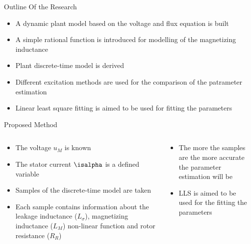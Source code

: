 \documentclass[11pt,aspectratio=169]{beamer}
\begin{document}
\begin{frame}{Outline Of the Research}
    \begin{itemize}
        \item A dynamic plant model based on the voltage and flux equation is built
        \item A simple rational function is introduced for modelling of the magnetizing inductance
        \item Plant discrete-time model is derived
        \item Different excitation methods are used for the comparison of the patrameter estimation
        \item Linear least square fitting is aimed to be used for fitting the parameters
    \end{itemize}
\end{frame}
\begin{frame}{Proposed Method}
\begin{columns}
\begin{column}{.43\textwidth}
\begin{itemize}
    \item The voltage $u_{M}$  is known
    \item The stator current $\isalpha$ is a defined variable
    \item Samples of the discrete-time model are taken
    \item Each sample contains information about the leakage inductance ($L_{\sigma}$), magnetizing inductance ($L_{M}$) non-linear function and rotor resistance ($R_{R}$)
\end{itemize}
\end{column}
\begin{column}{.53\textwidth}
\begin{center}

    \end{center}
    \begin{itemize}
    \item The more the samples are the more accurate the parameter estimation will be
     \item LLS is aimed to be used for the fitting the parameters
     \end{itemize}
    \end{column}
    \end{columns}
\end{frame}
\end{document}
